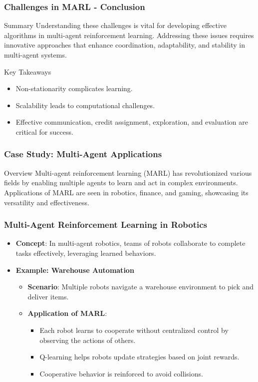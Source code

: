\documentclass[aspectratio=169]{beamer}
\begin{document}
\begin{frame}[fragile]
    \frametitle{Challenges in MARL - Conclusion}
    \begin{block}{Summary}
        Understanding these challenges is vital for developing effective algorithms in multi-agent reinforcement learning.
        Addressing these issues requires innovative approaches that enhance coordination, adaptability, and stability in multi-agent systems.
    \end{block}
    \begin{block}{Key Takeaways}
        \begin{itemize}
            \item Non-stationarity complicates learning.
            \item Scalability leads to computational challenges.
            \item Effective communication, credit assignment, exploration, and evaluation are critical for success.
        \end{itemize}
    \end{block}
\end{frame}

\begin{frame}[fragile]
    \frametitle{Case Study: Multi-Agent Applications}
    \begin{block}{Overview}
        Multi-agent reinforcement learning (MARL) has revolutionized various fields by enabling multiple agents to learn and act in complex environments. Applications of MARL are seen in robotics, finance, and gaming, showcasing its versatility and effectiveness.
    \end{block}
\end{frame}

\begin{frame}[fragile]
    \frametitle{Multi-Agent Reinforcement Learning in Robotics}
    \begin{itemize}
        \item \textbf{Concept}: In multi-agent robotics, teams of robots collaborate to complete tasks effectively, leveraging learned behaviors.
        \item \textbf{Example: Warehouse Automation}
        \begin{itemize}
            \item \textbf{Scenario}: Multiple robots navigate a warehouse environment to pick and deliver items.
            \item \textbf{Application of MARL}:
            \begin{itemize}
                \item Each robot learns to cooperate without centralized control by observing the actions of others.
                \item Q-learning helps robots update strategies based on joint rewards.
                \item Cooperative behavior is reinforced to avoid collisions.
            \end{itemize}
        \end{itemize}
    \end{itemize}
\end{frame}
\end{document}
